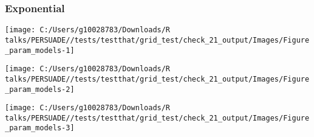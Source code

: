 \documentclass[
]{article}
\begin{document}
\clearpage

\begin{table}[H]
\centering
\caption{\label{tab:Table_2}Goodness of fit statistics}
\centering
{}
\end{table}

\clearpage

\clearpage

\subsubsection{Exponential}\label{exponential}

\begin{flushleft}\texttt{[image: C:/Users/g10028783/Downloads/R talks/PERSUADE//tests/testthat/grid\_test/check\_21\_output/Images/Figure\_param\_models-1]} \end{flushleft}

\begin{flushleft}\texttt{[image: C:/Users/g10028783/Downloads/R talks/PERSUADE//tests/testthat/grid\_test/check\_21\_output/Images/Figure\_param\_models-2]} \end{flushleft}

\begin{flushleft}\texttt{[image: C:/Users/g10028783/Downloads/R talks/PERSUADE//tests/testthat/grid\_test/check\_21\_output/Images/Figure\_param\_models-3]} \end{flushleft}

\clearpage
\end{document}
